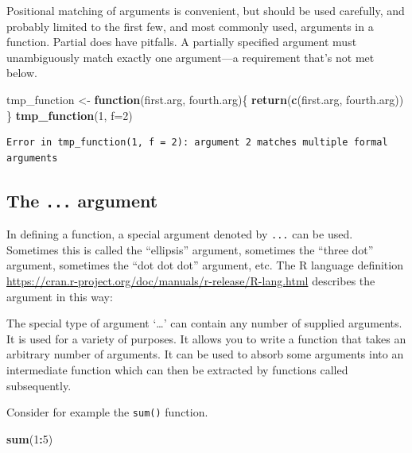 \documentclass[
]{krantz}
\makeatletter
\newenvironment{Shaded}{\begin{snugshade}}{\end{snugshade}}
\newcommand{\ControlFlowTok}[1]{\textcolor[rgb]{0.27,0.27,0.27}{\textbf{#1}}}
\newcommand{\DataTypeTok}[1]{\textcolor[rgb]{0.27,0.27,0.27}{#1}}
\newcommand{\DecValTok}[1]{\textcolor[rgb]{0.06,0.06,0.06}{#1}}
\newcommand{\KeywordTok}[1]{\textcolor[rgb]{0.27,0.27,0.27}{\textbf{#1}}}
\newcommand{\NormalTok}[1]{#1}
\newcommand{\OperatorTok}[1]{\textcolor[rgb]{0.43,0.43,0.43}{\textbf{#1}}}
\newcommand{\StringTok}[1]{\textcolor[rgb]{0.5,0.5,0.5}{#1}}
\renewenvironment{quote}{\begin{VF}}{\end{VF}}
\newenvironment{kframe}{%
\medskip{}
\setlength{\fboxsep}{.8em}
 \def\at@end@of@kframe{}%
 \ifinner\ifhmode%
  \def\at@end@of@kframe{\end{minipage}}%
  \begin{minipage}{\columnwidth}%
 \fi\fi%
 \def\FrameCommand##1{\hskip\@totalleftmargin \hskip-\fboxsep
 \colorbox{shadecolor}{##1}\hskip-\fboxsep
     \hskip-\linewidth \hskip-\@totalleftmargin \hskip\columnwidth}%
 \MakeFramed {\advance\hsize-\width
   \@totalleftmargin\z@ \linewidth\hsize
   \@setminipage}}%
 {\par\unskip\endMakeFramed%
 \at@end@of@kframe}
\renewenvironment{Shaded}{\begin{kframe}}{\end{kframe}}
\makeatother
\begin{document}
Positional matching of arguments is convenient, but should be used carefully, and probably limited to the first few, and most commonly used, arguments in a function. Partial does have pitfalls. A partially specified argument must unambiguously match exactly one argument---a requirement that's not met below.

\begin{Shaded}
\begin{Highlighting}[]
\NormalTok{tmp\_function \textless{}{-}}\StringTok{ }\ControlFlowTok{function}\NormalTok{(first.arg, fourth.arg)\{}
    \KeywordTok{return}\NormalTok{(}\KeywordTok{c}\NormalTok{(first.arg, fourth.arg))}
\NormalTok{\}}
\KeywordTok{tmp\_function}\NormalTok{(}\DecValTok{1}\NormalTok{, }\DataTypeTok{f=}\DecValTok{2}\NormalTok{)}
\end{Highlighting}
\end{Shaded}

\begin{verbatim}
Error in tmp_function(1, f = 2): argument 2 matches multiple formal arguments
\end{verbatim}

\hypertarget{the-...-argument}{%
\subsection{\texorpdfstring{The \texttt{...} argument}{The ... argument}}\label{the-...-argument}}

In defining a function, a special argument denoted by \texttt{...} can be used. Sometimes this is called the ``ellipsis'' argument, sometimes the ``three dot'' argument, sometimes the ``dot dot dot'' argument, etc. The R language definition \url{https://cran.r-project.org/doc/manuals/r-release/R-lang.html} describes the argument in this way:

\begin{quote}
The special type of argument `\ldots' can contain any number of supplied arguments. It is used for a variety of purposes. It allows you to write a function that takes an arbitrary number of arguments. It can be used to absorb some arguments into an intermediate function which can then be extracted by functions called subsequently.
\end{quote}

Consider for example the \texttt{sum()} function.

\begin{Shaded}
\begin{Highlighting}[]
\KeywordTok{sum}\NormalTok{(}\DecValTok{1}\OperatorTok{:}\DecValTok{5}\NormalTok{)}
\end{Highlighting}
\end{Shaded}
\end{document}
